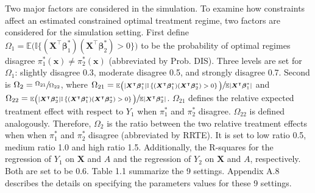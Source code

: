 \documentclass[12pt]{article}
\newcommand{\itl}{\intercal}
\newcommand{\bs}{ \boldsymbol}
\newcommand{\mb}{\mathbb}
\newcommand{\lt}{\left}
\newcommand{\rt}{\right}
\begin{document}
Two major factors are considered in the simulation. To examine how constraints affect an estimated constrained optimal treatment regime, two factors are considered for the simulation setting. First define $\Omega_{1}= \mb{E}\big(\mb{I}\{(\bs{X}^{\itl}\bs{\beta}^*_1)(\bs{X}^{\itl}\bs{\beta}^{*}_{2}) > 0\}\big)$ to be the probability of optimal regimes disagree $\pi^{*}_{1}(\bs{x}) \ne \pi^{*}_{2}(\bs{x})$ (abbreviated by Prob. DIS). Three levels are set for $\Omega_{1}$: slightly disagree 0.3, moderate disagree 0.5, and strongly disagree 0.7. Second is $\Omega_2 = \sfrac{\Omega_{21}}{\Omega_{22}}$, where $\Omega_{21} = \sfrac{
	\mb{E}\big(|\bs{X}^{\itl}\bs{\beta}^*_1|\mb{I}\lt\{(\bs{X}^{\itl}\bs{\beta}^*_1)(\bs{X}^{\itl}\bs{\beta}^{*}_{2})>0\rt\}\big)}{\mb{E}|\bs{X}^{\itl}\bs{\beta}^*_1|}$ and $\Omega_{22} = \sfrac{
	\mb{E}\big(|\bs{X}^{\itl}\bs{\beta}^*_2|\mb{I}\lt\{(\bs{X}^{\itl}\bs{\beta}^*_1)(\bs{X}^{\itl}\bs{\beta}^{*}_{2})>0\rt\}\big)}{\mb{E}|\bs{X}^{\itl}\bs{\beta}^*_2|}$.  $\Omega_{21}$ defines the relative expected treatment effect with respect to $Y_1$ when $\pi^{*}_{1}$ and $\pi^{*}_{2}$ disagree. $\Omega_{22}$ is defined analogously. Therefore, $\Omega_{2}$ is the ratio between the two relative treatment effects when when $\pi^{*}_{1}$ and $\pi^{*}_{2}$ disagree (abbreviated by RRTE). It is set to low ratio 0.5, medium ratio 1.0 and high ratio 1.5. Additionally, the R-squares for the regression of $Y_1$ on $\bs{X}$ and $A$ and the regression of $Y_2$ on $\bs{X}$ and $A$, respectively. Both are set to be 0.6.  Table 1.1 summarize the 9 settings. Appendix A.8 describes the details on specifying the parameters values for these 9 settings. \\
\end{document}
